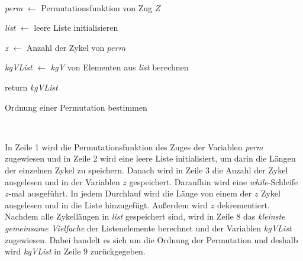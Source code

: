 \documentclass[12pt,a4paper, usenames, dvipsnames]{article}
\theoremstyle{mystyle}
\theoremstyle{definition}
\begin{document}
\begin{minipage}[H]{0.14\textwidth}
      $\ $
\end{minipage}
\begin{minipage}[H]{0.72\textwidth}
\begin{algorithm}[H]
\LinesNumbered
\DontPrintSemicolon
{}
\BlankLine
 \textit{perm} $\leftarrow$ Permutationsfunktion von Zug $Z$\;

  \textit{list} $\leftarrow$ leere Liste initialisieren\;

  \textit{z} $\leftarrow$ Anzahl der Zykel von $perm$ \; 

  \textit{kgVList} $\leftarrow$ \textit{kgV} von Elementen aus \textit{list} berechnen \;

 return \textit{kgVList} \;

\caption{Ordnung einer Permutation bestimmen} 
\label{Algorithmus_OrdnungPermutation}
\end{algorithm}
\end{minipage}
\begin{minipage}[H]{0.14\textwidth}
      $\ $
\end{minipage}

\vspace*{1em}

In Zeile 1 wird die Permutationsfunktion des Zuges der Variablen \textit{perm} zugewiesen und in Zeile 2 wird eine leere Liste initialisiert, um darin die Längen der einzelnen Zykel zu speichern. Danach wird in Zeile 3 die Anzahl der Zykel ausgelesen und in der Variablen $z$ gespeichert. Daraufhin wird eine \textit{while}-Schleife $z$-mal ausgeführt. In jedem Durchlauf wird die Länge von einem der $z$ Zykel ausgelesen und in die Liste hinzugefügt. Außerdem wird $z$ dekrementiert. Nachdem alle Zykellängen in \textit{list} gespeichert sind, wird in Zeile 8 das \textit{kleinste gemeinsame Vielfache} der Listenelemente berechnet und der Variablen \textit{kgVList} zugewiesen. Dabei handelt es sich um die Ordnung der Permutation und deshalb wird \textit{kgVList} in Zeile 9 zurückgegeben.
\end{document}
